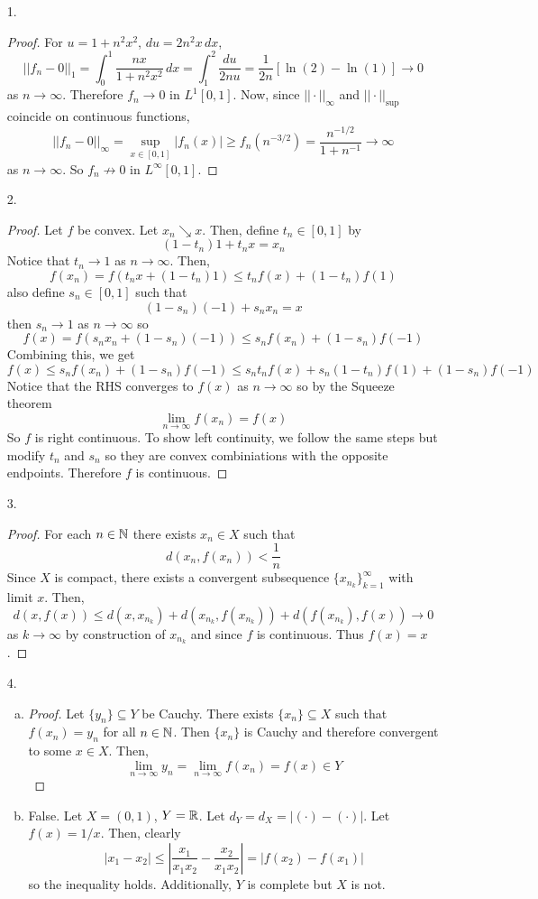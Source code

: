 \begin{itemize}
\item[1.] \begin{proof}
	For $u = 1+n^2x^2$, $du = 2n^2x \, dx$,
	\[ ||f_n-0||_1 = \int_0^1 \dfrac{nx}{1+n^2x^2} \, dx = \int_1^2 \dfrac{du}{2nu} = \dfrac{1}{2n} [\ln(2)-\ln(1)] \to 0\]
	as $n \to \infty$. Therefore $f_n \to 0$ in $L^1[0,1]$. Now, since $||\cdot||_\infty$ and $||\cdot||_{\sup}$ coincide on continuous functions,
	\[ ||f_n-0||_\infty = \sup_{x \in [0,1]} |f_n(x)| \ge f_n(n^{-3/2}) = \dfrac{n^{-1/2}}{1+n^{-1}} \to \infty \]
	as $n \to \infty$. So $f_n \not\to 0$ in $L^\infty[0,1]$.
\end{proof}

\item[2.] \begin{proof}
	Let $f$ be convex. Let $x_n \searrow x$. Then, define $t_n \in [0,1]$ by
		\[ (1-t_n)1+t_nx = x_n \]
	Notice that $t_n\to 1$ as $n \to \infty$. Then,
		\[ f(x_n) = f(t_nx+(1-t_n)1) \le t_nf(x)+(1-t_n)f(1) \]
	also define $s_n \in [0,1]$ such that
		\[ (1-s_n)(-1) + s_nx_n = x \]
	then $s_n \to 1$ as $n \to \infty$ so
		\[ f(x) = f(s_nx_n + (1-s_n)(-1)) \le s_nf(x_n) + (1-s_n)f(-1) \]
	Combining this, we get
		\[ f(x) \le s_nf(x_n) + (1-s_n)f(-1) \le s_nt_nf(x)+s_n(1-t_n)f(1) + (1-s_n)f(-1) \]
	Notice that the RHS converges to $f(x)$ as $n \to \infty$ so by the Squeeze theorem
		\[ \lim_{n\to\infty} f(x_n) = f(x) \]
	So $f$ is right continuous. To show left continuity, we follow the same steps but modify $t_n$ and $s_n$ so they are convex combiniations with the opposite endpoints. Therefore $f$ is continuous.
\end{proof}

\item[3.] \begin{proof}
	For each $n \in \mathbb{N}$ there exists $x_n \in X$ such that
		\[ d(x_n,f(x_n)) < \dfrac 1n \]
	Since $X$ is compact, there exists a convergent subsequence $\{x_{n_k}\}_{k=1}^\infty$ with limit $x$. Then,
		\[ d(x,f(x)) \le d(x,x_{n_k}) + d(x_{n_k},f(x_{n_k})) + d(f(x_{n_k}),f(x)) \to 0\]
	as $k \to \infty$ by construction of $x_{n_k}$ and since $f$ is continuous. Thus $f(x)=x$.
\end{proof}

\item[4.] \begin{enumerate}[(a)] 
	\item \begin{proof}
	Let $\{y_n\} \subseteq Y$ be Cauchy. There exists $\{x_n\} \subseteq X$ such that $f(x_n)=y_n$ for all $n \in \mathbb{N}$. Then $\{x_n\}$ is Cauchy and therefore convergent to some $x\in X$. Then,
		\[ \lim_{n\to\infty} y_n = \lim_{n \to \infty} f(x_n) = f(x) \in Y \]
	\end{proof}
	\item False. Let $X=(0,1)$, $Y=\mathbb{R}$. Let $d_Y=d_X = |(\cdot) - (\cdot)|$. Let $f(x) = 1/x$. Then, clearly
		\[ |x_1-x_2| \le \left| \dfrac{x_1}{x_1x_2} - \dfrac{x_2}{x_1x_2} \right| = |f(x_2)-f(x_1)| \]
	so the inequality holds. Additionally, $Y$ is complete but $X$ is not.
\end{enumerate}


\end{itemize}
